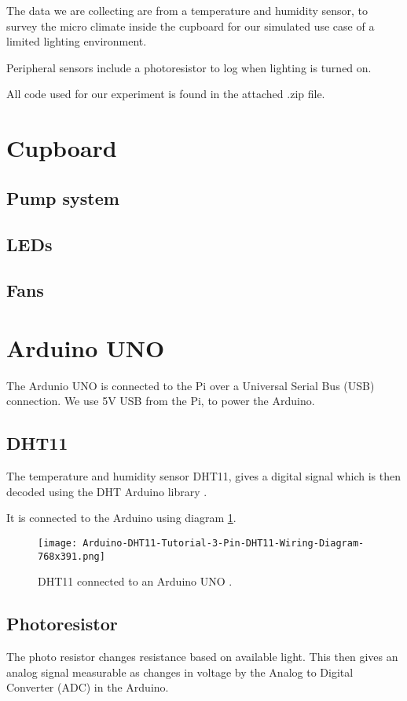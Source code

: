 \documentclass[a4paper,12pt,twoside,openright,titlepage]{book}
\begin{document}
The data we are collecting are from a temperature and humidity sensor, to survey the micro climate inside the cupboard for our simulated use case of a limited lighting environment.

Peripheral sensors include a photoresistor to log when lighting is turned on.

All code used for our experiment is found in the attached .zip file.

\section{Cupboard}

\subsection{Pump system}


\subsection{LEDs}


\subsection{Fans}


\section{Arduino UNO}
The Ardunio UNO is connected to the Pi over a Universal Serial Bus (USB) connection.
We use 5V USB from the Pi, to power the Arduino.

\subsection{DHT11}
The temperature and humidity sensor DHT11, gives a digital signal which is then decoded using the DHT Arduino library \cite{dht}.

It is connected to the Arduino using diagram \ref{diagram1}.

\begin{figure}[h]
    \texttt{[image: Arduino-DHT11-Tutorial-3-Pin-DHT11-Wiring-Diagram-768x391.png]}
    \caption{DHT11 connected to an Arduino UNO \cite{dht}.}
    \label{diagram1}
\end{figure}

\subsection{Photoresistor}
The photo resistor changes resistance based on available light.
This then gives an analog signal measurable as changes in voltage by the Analog to Digital Converter (ADC) in the Arduino.
\end{document}
